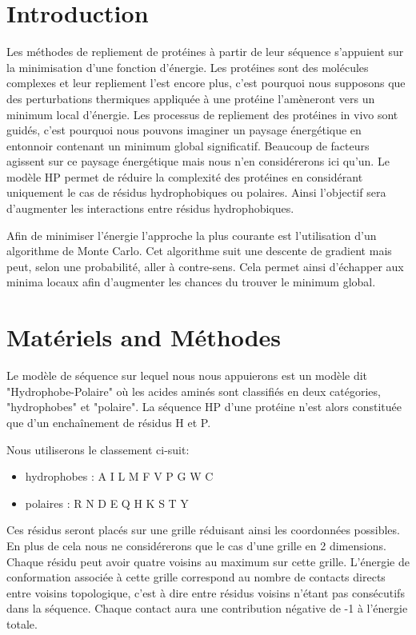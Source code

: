 \onehalfspacing

\section{Introduction}

Les méthodes de repliement de protéines à partir de leur séquence s'appuient sur la minimisation d'une fonction d'énergie. Les protéines sont des molécules complexes et leur repliement l'est encore plus, c'est pourquoi nous supposons que des perturbations thermiques appliquée à une protéine l'amèneront vers un minimum local d'énergie. Les processus de repliement des protéines in vivo sont guidés, c'est pourquoi nous pouvons imaginer un paysage énergétique en entonnoir contenant un minimum global significatif. Beaucoup de facteurs agissent sur ce paysage énergétique mais nous n'en considérerons ici qu'un. Le modèle HP permet de réduire la complexité des protéines en considérant uniquement le cas de résidus hydrophobiques ou polaires. Ainsi l'objectif sera d'augmenter les interactions entre résidus hydrophobiques.

Afin de minimiser l'énergie l'approche la plus courante est l'utilisation d'un algorithme de Monte Carlo. Cet algorithme suit une descente de gradient mais peut, selon une probabilité, aller à contre-sens. Cela permet ainsi d'échapper aux minima locaux afin d'augmenter les chances du trouver le minimum global.

\section{Matériels and Méthodes}

Le modèle de séquence sur lequel nous nous appuierons est un modèle dit "Hydrophobe-Polaire" où les acides aminés sont classifiés en deux catégories, "hydrophobes" et "polaire". La séquence HP d'une protéine n'est alors constituée que d'un enchaînement de résidus H et P.

Nous utiliserons le classement ci-suit:
\begin{itemize}
    \item hydrophobes : A I L M F V P G W C
    \item polaires : R N D E Q H K S T Y
\end{itemize}

Ces résidus seront placés sur une grille réduisant ainsi les coordonnées possibles. En plus de cela nous ne considérerons que le cas d'une grille en 2 dimensions. Chaque résidu peut avoir quatre voisins au maximum sur cette grille. L'énergie de conformation associée à cette grille correspond au nombre de contacts directs entre voisins topologique, c'est à dire entre résidus voisins n'étant pas consécutifs dans la séquence. Chaque contact aura une contribution négative de -1 à l'énergie totale.


